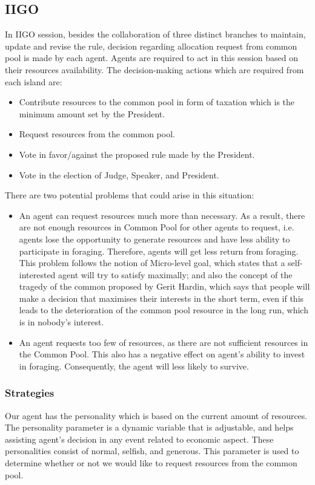 \subsection{IIGO} \label{subsec:Team6_IIGO}
In IIGO session, besides the collaboration of three distinct branches to maintain, update and revise the rule, decision regarding allocation request from common pool is made by each agent. Agents are required to act in this session based on their resources availability. The decision-making actions which are required from each island are:
\begin{itemize}
    \item Contribute resources to the common pool in form of taxation which is the minimum amount set by the President.
    \item Request resources from the common pool.
    \item Vote in favor/against the proposed rule made by the President.
    \item Vote in the election of Judge, Speaker, and President.
\end{itemize}
There are two potential problems that could arise in this situation:
\begin{itemize}
\item An agent can request resources much more than necessary. As a result, there are not enough resources in Common Pool for other agents to request, i.e. agents lose the opportunity to generate resources and have less ability to participate in foraging. Therefore, agents will get less return from foraging. This problem follows the notion of Micro-level goal, which states that a self-interested agent will try to satisfy maximally; and also the concept of the tragedy of the common proposed by Gerit Hardin, which says that people will make a decision that maximises their interests in the short term, even if this leads to the deterioration of the common pool resource in the long run, which is in nobody's interest.
\item An agent requests too few of resources, as there are not sufficient resources in the Common Pool. This also has a negative effect on agent’s ability to invest in foraging. Consequently, the agent will less likely to survive. 
\end{itemize}

\subsubsection{Strategies} \label{subsubsec:Team6_IIGO:Strategies}
Our agent has the personality which is based on the current amount of resources. The personality parameter is a dynamic variable that is adjustable, and helps assisting agent’s decision in any event related to economic aspect. These personalities consist of normal, selfish, and generous. This parameter is used to determine whether or not we would like to request resources from the common pool. 


